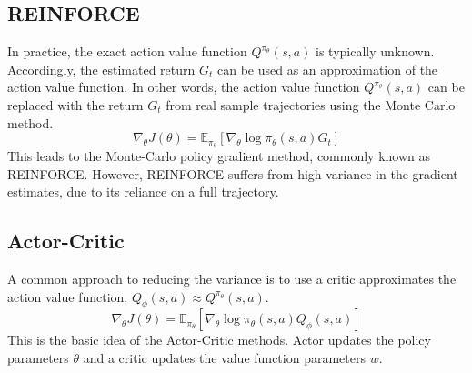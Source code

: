 \subsection{REINFORCE}

In practice, the exact action value function $Q^{\pi_\theta} (s, a)$ is typically unknown.
Accordingly, the estimated return $G_t$ can be used as an approximation of the action value function.
In other words, the action value function $Q^{\pi_\theta} (s, a)$ can be replaced with the return $G_t$ from real sample trajectories using the Monte Carlo method.
\begin{equation}
  \nabla_\theta J(\theta) = \mathbb{E}_{\pi_\theta}[\nabla_\theta \log \pi_\theta(s, a) G_t]
\end{equation}
This leads to the Monte-Carlo policy gradient method, commonly known as REINFORCE.
However, REINFORCE suffers from high variance in the gradient estimates, due to its reliance on a full trajectory.

\subsection{Actor-Critic}

A common approach to reducing the variance is to use a critic approximates the action value function, $Q_\phi(s, a) \approx Q^{\pi_\theta}(s, a)$.
\begin{equation}
  \nabla_\theta J(\theta) = \mathbb{E}_{\pi_\theta} [\nabla_\theta \log \pi_\theta(s, a) Q_\phi(s, a)]
\end{equation}
This is the basic idea of the Actor-Critic methods.
Actor updates the policy parameters $\theta$ and a critic updates the value function parameters $w$.

